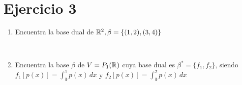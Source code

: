 \section*{Ejercicio 3}

\begin{enumerate}
    \item Encuentra la base dual de $\mathbb{R}^{2}, \beta = \{ (1,2),(3,4) \}$
    
    \noindent \solucion \\

    \item Encuentra la base $\beta$ de $V = P_{1} (\mathbb{R})$ cuya base dual es $\beta^{*} = \{ f_{1},f_{2} \}$, siendo 
          $f_{1} \left[ p(x) \right] = \int_{0}^{1} p(x) \, dx$ y $f_{2} \left[ p(x) \right] = \int_{0}^{2} p(x) \, dx$ 

    \noindent \solucion \\
\end{enumerate}

